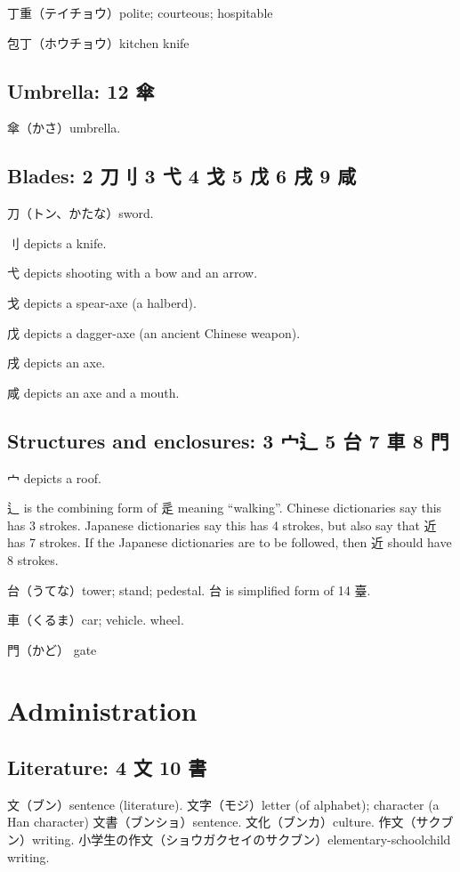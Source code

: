 丁重（テイチョウ）polite; courteous; hospitable

包丁（ホウチョウ）kitchen knife

\subsection{Umbrella: 12 傘}

傘（かさ）umbrella.

\subsection{Blades: 2 刀刂 3 弋 4 戈 5 戊 6 戌 9 咸}

刀（トン、かたな）sword.

刂 depicts a knife.

弋 depicts shooting with a bow and an arrow.

戈 depicts a spear-axe (a halberd).

戊 depicts a dagger-axe (an ancient Chinese weapon).

戌 depicts an axe.

咸 depicts an axe and a mouth.

\subsection{Structures and enclosures: 3 宀辶 5 台 7 車 8 門}

宀 depicts a roof.

辶 is the combining form of 辵 meaning ``walking''.
Chinese dictionaries say this has 3 strokes.
Japanese dictionaries say this has 4 strokes,
but also say that 近 has 7 strokes.
If the Japanese dictionaries are to be followed,
then 近 should have 8 strokes.

台（うてな）tower; stand; pedestal.
台 is simplified form of 14 臺.

車（くるま）car; vehicle. wheel.

門（かど） gate

\section{Administration}

\subsection{Literature: 4 文 10 書}

文（ブン）sentence (literature).
文字（モジ）letter (of alphabet); character (a Han character)
文書（ブンショ）sentence.
文化（ブンカ）culture.
作文（サクブン）writing.
小学生の作文（ショウガクセイのサクブン）elementary-schoolchild writing.

